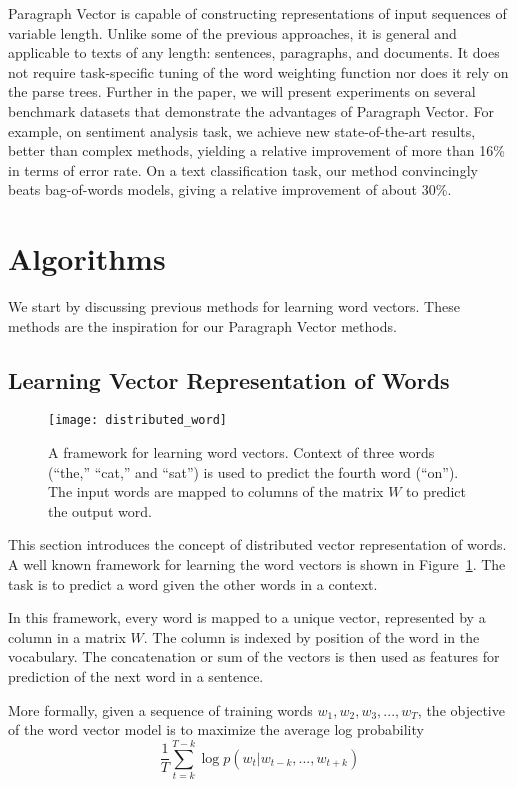\documentclass{article}
\begin{document}
Paragraph Vector is capable of constructing representations of input
sequences of variable length. Unlike some of the previous approaches,
it is general and applicable to texts of any length: sentences,
paragraphs, and documents.  It does not require task-specific tuning
of the word weighting function nor does it rely on the parse trees.
Further in the paper, we will present experiments on several benchmark
datasets that demonstrate the advantages of Paragraph Vector. For
example, on sentiment analysis task, we achieve new state-of-the-art
results, better than complex methods, yielding a relative improvement
of more than 16\% in terms of error rate. On a text classification
task, our method convincingly beats bag-of-words models, giving a
relative improvement of about 30\%.

\section{Algorithms}
We start by discussing previous methods for learning word
vectors. These methods are the inspiration for our Paragraph Vector
methods.

\subsection{Learning Vector Representation of Words}

\begin{figure}[bht]
\texttt{[image: distributed\_word]}
\caption{A framework for learning word vectors. Context of three words
  (``the,'' ``cat,'' and ``sat'') is used to predict the fourth word
  (``on''). The input words are mapped to columns of the matrix $W$ to
  predict the output word.}
\label{fig:lm}
\end{figure}


This section introduces the concept of distributed vector
representation of words.  A well known framework for learning the word
vectors is shown in Figure~\ref{fig:lm}. The task is to predict a word
given the other words in a context.

In this framework, every word is mapped to a unique vector,
represented by a column in a matrix $W$. The column is indexed by
position of the word in the vocabulary. The concatenation or sum of
the vectors is then used as features for prediction of the next word
in a sentence.  

More formally, given a sequence of training words $w_1, w_2, w_3, ...,
w_T$, the objective of the word vector model is to maximize the
average log probability
\[
\frac{1}{T}\sum_{t=k}^{T-k} \log p (w_t | w_{t-k}, ..., w_{t+k})
\]
\end{document}
